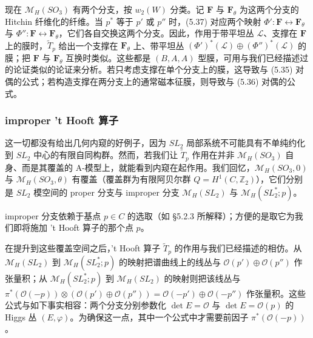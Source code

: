 现在 $\mathcal{M}_H(SO_3)$ 有两个分支，按 $w_2(W)$ 分类。记 $\boldsymbol{F}$ 与 $\boldsymbol{F}_\theta$ 为这两个分支的 Hitchin 纤维化的纤维。当 $p^*$ 等于 $p'$ 或 $p''$ 时，(5.37) 对应两个映射 $\Phi':\boldsymbol{F}\leftrightarrow\boldsymbol{F}_\theta$ 与 $\Phi'':\boldsymbol{F}\leftrightarrow\boldsymbol{F}_\theta$，它们各自交换这两个分支。因此，作用于带平坦丛 $\mathcal{L}$、支撑在 $\boldsymbol{F}$ 上的膜时，$\widetilde{T}_p$ 给出一个支撑在 $\boldsymbol{F}_\theta$ 上、带平坦丛 $(\Phi')^*(\mathcal{L})\oplus(\Phi'')^*(\mathcal{L})$ 的膜；把 $\boldsymbol{F}$ 与 $\boldsymbol{F}_\theta$ 互换时类似。这些都是 $(B,A,A)$ 型膜，可用与我们已经描述过的论证类似的论证来分析。若只考虑支撑在单个分支上的膜，这导致与 (5.35) 对偶的公式；若构造支撑在两分支上的通常磁本征膜，则导致与 (5.36) 对偶的公式。

\subsubsection{improper 't Hooft 算子}

这一切都没有给出几何内窥的好例子，因为 $SL_2$ 局部系统不可能具有不单纯约化到 $SL_2$ 中心的有限自同构群。然而，若我们让 $\widetilde{T}_p$ 作用在并非 $\mathcal{M}_H(SO_3)$ 自身、而是其覆盖的 A-模型上，就能看到内窥在起作用。我们回忆，$\mathcal{M}_H(SO_3,0)$ 与 $\mathcal{M}_H(SO_3,\theta)$ 有覆盖（覆盖群为有限阿贝尔群 $Q=H^1(C,\mathbb{Z}_2)$），它们分别是 $SL_2$ 模空间的 proper 分支与 improper 分支
$\mathcal{M}_H(SL_2)$ 与 $\mathcal{M}_H(SL_2^*;p)$。

improper 分支依赖于基点 $p\in C$ 的选取（如 §5.2.3 所解释）；方便的是取它为我们即将施加 't Hooft 算子的那个点 $p$。

在提升到这些覆盖空间之后，'t Hooft 算子 $\widetilde{T}_p$ 的作用与我们已经描述的相仿。从 $\mathcal{M}_H(SL_2)$ 到 $\mathcal{M}_H(SL_2^*;p)$ 的映射把谱曲线上的线丛与 $\mathcal{O}(p')\oplus\mathcal{O}(p'')$ 作张量积；从 $\mathcal{M}_H(SL_2^*;p)$ 到 $\mathcal{M}_H(SL_2)$ 的映射则把该线丛与 $\pi^*(\mathcal{O}(-p))\otimes(\mathcal{O}(p')\oplus\mathcal{O}(p''))=\mathcal{O}(-p')\oplus\mathcal{O}(-p'')$ 作张量积。这些公式与如下事实相容：两个分支分别参数化 $\det E=\mathcal{O}$ 与 $\det E=\mathcal{O}(p)$ 的 Higgs 丛 $(E,\varphi)$。为确保这一点，其中一个公式中才需要前因子 $\pi^*(\mathcal{O}(-p))$。

